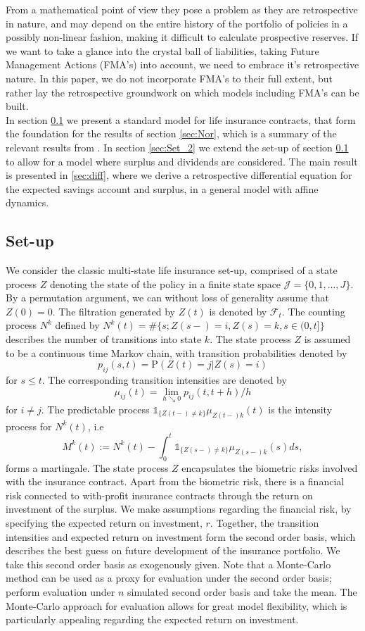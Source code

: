 \documentclass[12pt]{article}
\newcommand{\indic}[1]{\mathds{1}_{ \{ #1 \} }}
\renewcommand{\P}{\text{P}}
\theoremstyle{my_thm}
\begin{document}
From a mathematical point of view they pose a problem as they are retrospective in nature, and may depend on the entire history of the portfolio of policies in a possibly non-linear fashion, making it difficult to calculate prospective reserves. If we want to take a glance into the crystal ball of liabilities, taking Future Management Actions (FMA's) into account, we need to embrace it's retrospective nature. In this paper, we do not incorporate FMA's to their full extent, but rather lay the retrospective groundwork on which models including FMA's can be built.
\\[12pt]
In section \ref{sec:Set_1} we present a standard model for life insurance contracts, that form the foundation for the results of section \ref{sec:Nor}, which is a summary of the relevant results from \citet{Norberg}. In section \ref{sec:Set_2} we extend the set-up of section \ref{sec:Set_1} to allow for a model where surplus and dividends are considered. The main result is presented in \ref{sec:diff}, where we derive a retrospective differential equation for the expected savings account and surplus, in a general model with affine dynamics.

\subsection{Set-up} \label{sec:Set_1}
We consider the classic multi-state life insurance set-up, comprised of a state process $Z$ denoting the state of the policy in a finite state space $\mathcal{J}=\{0,1,...,J\}$. By a permutation argument, we can without loss of generality assume that $Z(0)=0$. The filtration generated by $Z(t)$ is denoted by $\mathcal{F}_t$. The counting process $N^{k}$ defined by $N^{k}(t)=\# \{ s; Z(s-)= i, Z(s)=k, s \in (0,t] \}$ describes the number of transitions into state $k$.  The state process $Z$ is assumed to be a continuous time Markov chain, with transition probabilities denoted by
$$
p_{ij}(s,t)= \P(Z(t)=j|Z(s)=i)
$$
for $s\leq t$. The corresponding transition intensities are denoted by
$$
\mu_{ij}(t)=\lim_{h \searrow 0} p_{ij}(t,t+h)/h
$$
for $i \neq j$. The predictable process $ \indic{Z(t-)\neq k }\mu_{Z(t-)k}(t)$ is the intensity process for $N^{k}(t)$, i.e
$$
M^{k}(t):=N^k(t)-\int_0^t \indic{Z(s-)\neq k } \mu_{Z(s-)k}(s) ds,
$$
forms a martingale. The state process $Z$ encapsulates the biometric risks involved with the insurance contract. Apart from the biometric risk, there is a financial risk connected to with-profit insurance contracts through the return on investment of the surplus. We make assumptions regarding the financial risk, by specifying the expected return on investment, $r$. Together, the transition intensities and expected return on investment form the second order basis, which describes the best guess on future development of the insurance portfolio. We take this second order basis as exogenously given. Note that a Monte-Carlo method can be used as a proxy for evaluation under the second order basis; perform evaluation under $n$ simulated second order basis and take the mean. The Monte-Carlo approach for evaluation allows for great model flexibility, which is particularly appealing regarding the expected return on investment. 
\end{document}
